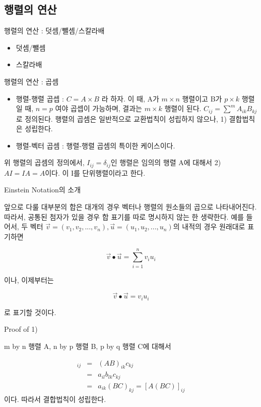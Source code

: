 \documentclass{beamer}
\begin{document}
\subsection{행렬의 연산}

\begin{frame}{행렬의 연산 : 덧셈/뺄셈/스칼라배} 
\begin{itemize} 
\item 덧셈/뺄셈 
\item 스칼라배
\end{itemize}
\end{frame}

\begin{frame}{행렬의 연산 : 곱셈} 
\begin{itemize} 
\item 행렬-행렬 곱셉 : $C = A\times B$ 라 하자. 이 때, A가 $m \times n$ 행렬이고 B가 $p \times k$ 행렬일 때, $n=p$ 여야 곱셉이 가능하며, 결과는 $m \times k$ 행렬이 된다. $C_{ij} = \sum^m A_{ik} B_{kj}$ 로 정의된다. 행렬의 곱셈은 일반적으로 교환법칙이 성립하지 않으나, 1) 결합법칙은 성립한다. 
\item 행렬-벡터 곱셈 : 행렬-행렬 곱셈의 특이한 케이스이다. 
\end{itemize}

위 행렬의 곱셈의 정의에서, $I_{ij} = \delta_{ij}$인 행렬은 임의의 행렬 A에 대해서 2) $AI = IA = A$이다. 이 I를 단위행렬이라고 한다. 
\end{frame}

\begin{frame}{Einstein Notation의 소개} 

앞으로 다룰 대부분의 합은 대개의 경우 벡터나 행렬의 원소들의 곱으로 나타내어진다. 따라서, 공통된 첨자가 있을 경우 합 표기를 따로 명시하지 않는 한 생략한다. 예를 들어서, 두 벡터 $\vec{v} = (v_1, v_2, ..., v_n), \vec{u} = (u_1, u_2, ..., u_n)$의 내적의 경우 원래대로 표기하면 

\begin{equation} 
\vec{v} \bullet \vec{u} = \sum^{n}_{i=1} v_i u_i 
\end{equation}

이나, 이제부터는 

\begin{equation} 
\vec{v} \bullet \vec{u} =  v_i u_i 
\end{equation}

로 표기할 것이다.

\end{frame}

\begin{frame}{Proof of 1)} 

m by n 행렬 A, n by p 행렬 B, p by q 행렬 C에 대해서 

\begin{eqnarray} 
[(AB)C]_{ij} & = & (AB)_{ik} c_{kj} \\
& = & a_{il}b_{lk}c_{kj}  \\
& = & a_{ik} (BC)_{kj}  = [A(BC)]_{ij}
\end{eqnarray}
이다. 따라서 결합법칙이 성립한다. 
\end{frame}
\end{document}
